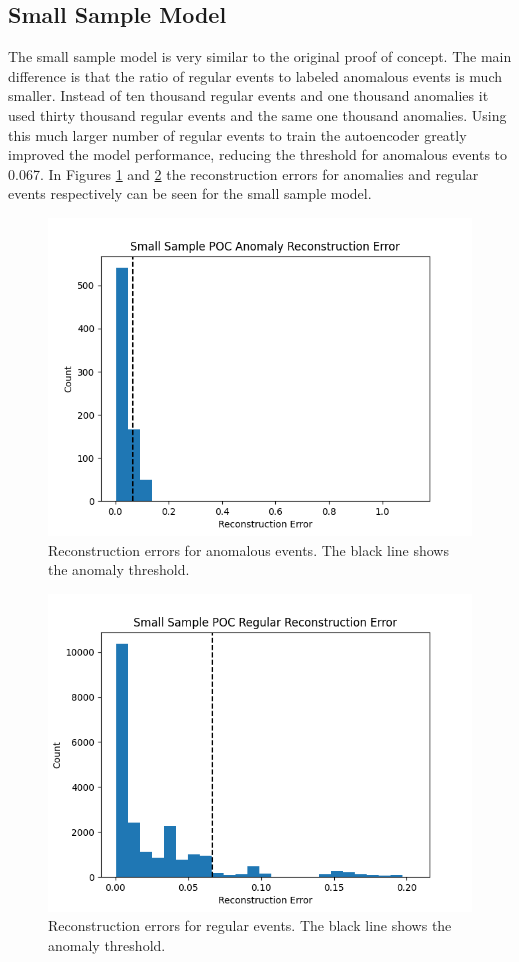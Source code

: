\documentclass[a4paper,11pt]{article}
\begin{document}
\subsection{Small Sample Model}
The small sample model is very similar to the original proof of concept. The main difference is that the ratio of regular events to labeled anomalous events is much smaller. Instead of ten thousand regular events and one thousand anomalies it used thirty thousand regular events and the same one thousand anomalies. Using this much larger number of regular events to train the autoencoder greatly improved the model performance, reducing the threshold for anomalous events to 0.067. In Figures \ref{small_poc_anomaly} and \ref{small_poc_regular} the reconstruction errors for anomalies and regular events respectively can be seen for the small sample model.
\begin{figure}[H]
\centering
\includegraphics[width=.8\textwidth]{small_poc_anomaly_reconstruction.png}
\caption{Reconstruction errors for anomalous events. The black line shows the anomaly threshold.}
\label{small_poc_anomaly}
\end{figure}
\begin{figure}[H]
\centering
\includegraphics[width=.8\textwidth]{small_poc_regular_reconstruction.png}
\caption{Reconstruction errors for regular events. The black line shows the anomaly threshold.}
\label{small_poc_regular}
\end{figure}
\end{document}
